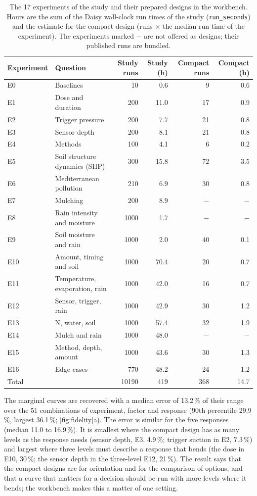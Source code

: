 \documentclass[preprint,12pt]{elsarticle}
\begin{document}
\begin{table}[H]\centering\small
\caption{The 17 experiments of the study and their prepared designs in the workbench. Hours are the sum of the Daisy wall-clock run times of the study (\texttt{run\_seconds}) and the estimate for the compact design (runs $\times$ the median run time of the experiment). The experiments marked $-$ are not offered as designs; their published runs are bundled.}\label{tab:designs}
\begin{tabular}{llrrrr}\toprule
Experiment & Question & Study runs & Study (h) & Compact runs & Compact (h)\\\midrule
E0 & Baselines & 10 & 0.6 & 9 & 0.6\\
E1 & Dose and duration & 200 & 11.0 & 17 & 0.9\\
E2 & Trigger pressure & 200 & 7.7 & 21 & 0.8\\
E3 & Sensor depth & 200 & 8.1 & 21 & 0.8\\
E4 & Methods & 100 & 4.1 & 6 & 0.2\\
E5 & Soil structure dynamics (SHP) & 300 & 15.8 & 72 & 3.5\\
E6 & Mediterranean pollution & 210 & 6.9 & 30 & 0.8\\
E7 & Mulching & 200 & 8.9 & $-$ & $-$\\
E8 & Rain intensity and moisture & 1000 & 1.7 & $-$ & $-$\\
E9 & Soil moisture and rain & 1000 & 2.0 & 40 & 0.1\\
E10 & Amount, timing and soil & 1000 & 70.4 & 20 & 0.7\\
E11 & Temperature, evaporation, rain & 1000 & 42.0 & 16 & 0.7\\
E12 & Sensor, trigger, rain & 1000 & 42.9 & 30 & 1.2\\
E13 & N, water, soil & 1000 & 57.4 & 32 & 1.9\\
E14 & Mulch and rain & 1000 & 48.0 & $-$ & $-$\\
E15 & Method, depth, amount & 1000 & 43.6 & 30 & 1.3\\
E16 & Edge cases & 770 & 48.2 & 24 & 1.2\\
\midrule Total & & 10190 & 419 & 368 & 14.7\\\bottomrule\end{tabular}\end{table}

The marginal curves are recovered with a median error of 13.2\,\% of their range over the 51 combinations of experiment, factor and response (90th percentile 29.9\,\%, largest 36.1\,\%; \cref{fig:fidelity}a). The error is similar for the five responses (median 11.0 to 16.9\,\%). It is smallest where the compact design has as many levels as the response needs (sensor depth, E3, 4.9\,\%; trigger suction in E2, 7.3\,\%) and largest where three levels must describe a response that bends (the dose in E10, 30\,\%; the sensor depth in the three-level E12, 21\,\%). The result says that the compact designs are for orientation and for the comparison of options, and that a curve that matters for a decision should be run with more levels where it bends; the workbench makes this a matter of one setting.
\end{document}
